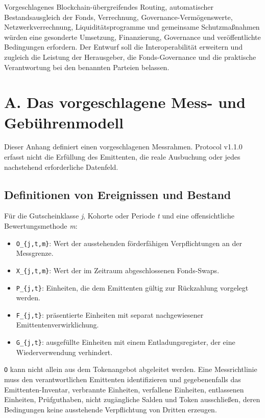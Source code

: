 \documentclass[11pt]{article}
\begin{document}
Vorgeschlagenes Blockchain-übergreifendes Routing, automatischer Bestandsausgleich der Fonds, Verrechnung, Governance-Vermögenswerte, Netzwerkverrechnung, Liquiditätsprogramme und gemeinsame Schutzmaßnahmen würden eine gesonderte Umsetzung, Finanzierung, Governance und veröffentlichte Bedingungen erfordern. Der Entwurf soll die Interoperabilität erweitern und zugleich die Leistung der Herausgeber, die Fonds-Governance und die praktische Verantwortung bei den benannten Parteien belassen.


\section*{A.  Das vorgeschlagene Mess- und Gebührenmodell}

Dieser Anhang definiert einen vorgeschlagenen Messrahmen. Protocol v1.1.0 erfasst nicht die Erfüllung des Emittenten, die reale Ausbuchung oder jedes nachstehend erforderliche Datenfeld.

\subsection*{Definitionen von Ereignissen und Bestand}

Für die Gutscheinklasse \emph{j}, Kohorte oder Periode \emph{t} und eine offensichtliche Bewertungsmethode \emph{m}:

\begin{itemize}[leftmargin=*]
\item \texttt{O\_\{j,t,m\}}: Wert der ausstehenden förderfähigen Verpflichtungen an der Messgrenze.
\item \texttt{X\_\{j,t,m\}}: Wert der im Zeitraum abgeschlossenen Fonds-Swaps.
\item \texttt{P\_\{j,t\}}: Einheiten, die dem Emittenten gültig zur Rückzahlung vorgelegt werden.
\item \texttt{F\_\{j,t\}}: präsentierte Einheiten mit separat nachgewiesener Emittentenverwirklichung.
\item \texttt{G\_\{j,t\}}: ausgefüllte Einheiten mit einem Entladungsregister, der eine Wiederverwendung verhindert.
\end{itemize}
\texttt{O} kann nicht allein aus dem Tokenangebot abgeleitet werden. Eine Messrichtlinie muss den verantwortlichen Emittenten identifizieren und gegebenenfalls das Emittenten-Inventar, verbrannte Einheiten, verfallene Einheiten, entlassenen Einheiten, Prüfguthaben, nicht zugängliche Salden und Token ausschließen, deren Bedingungen keine ausstehende Verpflichtung von Dritten erzeugen.
\end{document}
